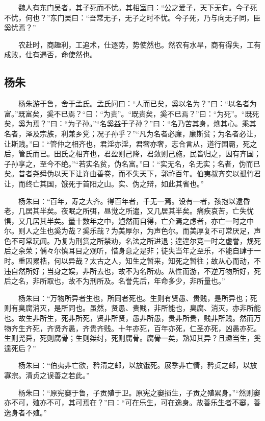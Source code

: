 　　魏人有东门吴者，其子死而不忧。其相室曰：``公之爱子，天下无有。今子死不忧，何也？''东门吴曰：``吾常无子，无子之时不忧。今子死，乃与向无子同，臣奚忧焉？''

　　农赴时，商趣利，工追术，仕逐势，势使然也。然农有水旱，商有得失，工有成败，仕有遇否，命使然也。

\hypertarget{ux6768ux6731}{%
\subsection{杨朱}\label{ux6768ux6731}}

　　杨朱游于鲁，舍于孟氏。孟氏问曰：``人而已矣，奚以名为？''曰：``以名者为富。''既富矣，奚不已焉？``曰：``为贵''。``既贵矣，奚不已焉？''曰：``为死''。``既死矣，奚为焉？''曰：``为子孙。''``名奚益于子孙？''曰：``名乃苦其身，燋其心。乘其名者，泽及宗族，利兼乡党；况子孙乎？''``凡为名者必廉，廉斯贫；为名者必让，让斯贱。''曰：``管仲之相齐也，君淫亦淫，君奢亦奢，志合言从，道行国霸，死之后，管氏而已。田氏之相齐也，君盈则己降，君敛则己施，民皆归之，因有齐国；子孙享之，至今不绝。''``若实名贫，伪名富。''曰：``实无名，名无实；名者，伪而已矣。昔者尧舜伪以天下让许由善卷，而不失天下，郭祚百年。伯夷叔齐实以孤竹君让，而终亡其国，饿死于首阳之山。实、伪之辩，如此其省也。''

　　杨朱曰：``百年，寿之大齐。得百年者，千无一焉。设有一者，孩抱以逮昏老，几居其半矣。夜眠之所弭，昼觉之所遣，又几居其半矣。痛疾哀苦，亡失忧惧，又几居其半矣。量十数年之中，逌然而自得，亡介焉之虑者，亦亡一时之中尔。则人之生也奚为哉？奚乐哉？为美厚尔，为声色尔。而美厚复不可常厌足，声色不可常玩闻。乃复为刑赏之所禁劝，名法之所进退；遑遑尔竞一时之虚誉，规死后之余荣；偊々尔慎耳目之观听，惜身意之是非；徒失当年之至乐，不能自肆于一时。重囚累梏，何以异哉？太古之人，知生之暂来，知死之暂往；故从心而动，不违自然所好；当身之娱，非所去也，故不为名所劝。从性而游，不逆万物所好，死后之名，非所取也，故不为刑所及。名誉先后，年命多少，非所量也。''

　　杨朱曰：``万物所异者生也，所同者死也。生则有贤愚、贵贱，是所异也；死则有臭腐消灭，是所同也。虽然，贤愚、贵贱，非所能也，臭腐、消灭，亦非所能也。故生非所生，死非所死，贤非所贤，愚非所愚，贵非所贵，贱非所贱。然而万物齐生齐死，齐贤齐愚，齐贵齐贱。十年亦死，百年亦死，仁圣亦死，凶愚亦死。生则尧舜，死则腐骨；生则桀纣，死则腐骨。腐骨一矣，熟知其异？且趣当生，奚遑死后？''

　　杨朱曰：``伯夷非亡欲，矜清之邮，以放饿死。展季非亡情，矜贞之邮，以放寡宗。清贞之误善之若此。''

　　杨朱曰：``原宪窭于鲁，子贡殖于卫。原宪之窭损生，子贡之殖累身。''``然则窭亦不可，殖亦不可，其可焉在？''曰：``可在乐生，可在逸身。故善乐生者不窭，善逸身者不殖。''

